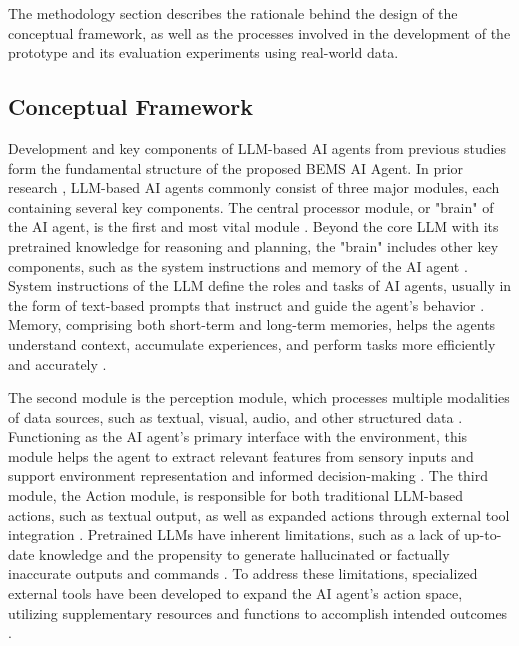 \documentclass[final,3p,times]{elsarticle}
\begin{document}
The methodology section describes the rationale behind the design of the conceptual framework, as well as the processes involved in the development of the prototype and its evaluation experiments using real-world data. 

\subsection{Conceptual Framework}

Development and key components of LLM-based AI agents from previous studies form the fundamental structure of the proposed BEMS AI Agent. In prior research \cite{xi2023rise, wang2024survey, zhao2023depth}, LLM-based AI agents commonly consist of three major modules, each containing several key components. The central processor module, or "brain" of the AI agent, is the first and most vital module \cite{xi2023rise}. Beyond the core LLM with its pretrained knowledge for reasoning and planning, the "brain" includes other key components, such as the system instructions and memory of the AI agent \cite{wang2024survey, zhao2023depth}. System instructions of the LLM define the roles and tasks of AI agents, usually in the form of text-based prompts that instruct and guide the agent's behavior \cite{wang2024survey}. Memory, comprising both short-term and long-term memories, helps the agents understand context, accumulate experiences, and perform tasks more efficiently and accurately \cite{wang2024survey, zhao2023depth}. 

The second module is the perception module, which processes multiple modalities of data sources, such as textual, visual, audio, and other structured data \cite{xi2023rise}. Functioning as the AI agent's primary interface with the environment, this module helps the agent to extract relevant features from sensory inputs and support environment representation and informed decision-making \cite{xi2023rise}. The third module, the Action module, is responsible for both traditional LLM-based actions, such as textual output, as well as expanded actions through external tool integration \cite{xi2023rise, wang2024survey, zhao2023depth}. Pretrained LLMs have inherent limitations, such as a lack of up-to-date knowledge and the propensity to generate hallucinated or factually inaccurate outputs and commands \cite{zhao2023depth, roller2020recipes}. To address these limitations, specialized external tools have been developed to expand the AI agent's action space, utilizing supplementary resources and functions to accomplish intended outcomes \cite{xi2023rise, wang2024survey, zhao2023depth}. 
\end{document}
